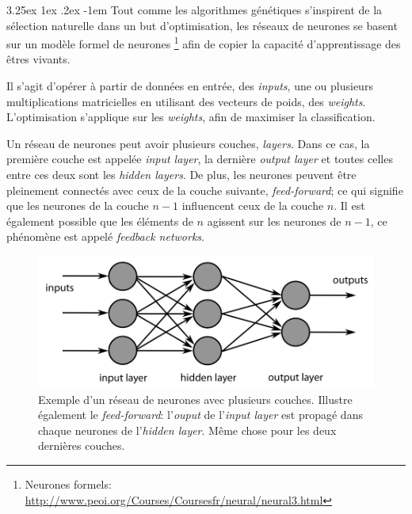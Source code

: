 \documentclass[a4paper, 11pt]{article}
\makeatletter
\renewcommand\paragraph{\@startsection{paragraph}{5}{\z@}%
  {3.25ex \@plus1ex \@minus.2ex}%
  {-1em}%
  {\normalfont\normalsize\bfseries}}
\makeatother
\begin{document}
\paragraph{}
Tout comme les algorithmes génétiques s'inspirent de la sélection naturelle\cite{algorithme_genetique} dans un but d'optimisation,
les réseaux de neurones se basent sur un modèle formel de neurones
\footnote{Neurones formels: \url{http://www.peoi.org/Courses/Coursesfr/neural/neural3.html}} afin de copier la capacité 
d'apprentissage des êtres vivants.

Il s'agit d'opérer à partir de données en entrée, des \textit{inputs}, une ou plusieurs multiplications matricielles
en utilisant des vecteurs de poids, des \textit{weights}. L'optimisation s'applique sur les \textit{weights},
afin de maximiser la classification.

Un réseau de neurones peut avoir plusieurs couches, \textit{layers}. Dans ce cas, la première couche est
appelée \textit{input layer}, la dernière \textit{output layer} et toutes celles entre ces deux sont
les \textit{hidden layers}. De plus, les neurones peuvent être pleinement connectés avec ceux de la couche
suivante, \textit{feed-forward}; ce qui signifie que les neurones de la couche $n-1$ influencent ceux de
la couche $n$. Il est également possible que les éléments de $n$ agissent sur les neurones de $n-1$, ce
phénomène est appelé \textit{feedback networks}.

\begin{figure}[H]
\centering
\includegraphics[scale=0.4]{images/neural_net_feedforward}
\caption[]{Exemple d'un réseau de neurones avec plusieurs couches. Illustre également
le \textit{feed-forward}: l'\textit{ouput} de l'\textit{input layer} est propagé dans chaque
neurones de l'\textit{hidden layer}. Même chose pour les deux dernières couches.\footnotemark}
\end{figure}
\end{document}

